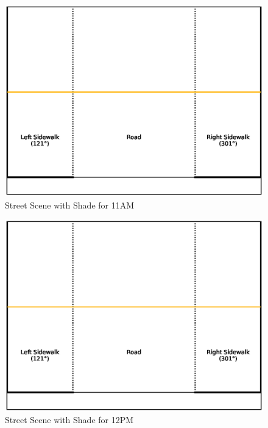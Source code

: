\documentclass[nohyperref]{article}
\theoremstyle{plain}
\theoremstyle{definition}
\theoremstyle{remark}
\begin{document}
\begin{figure}[ht]
\begin{center}
\centerline{\includegraphics[width=\columnwidth]{sidewalk_predictions/shade_at_11}}
\caption{Street Scene with Shade for 11AM}
\end{center}
\end{figure}

\begin{figure}[ht]
\begin{center}
\centerline{\includegraphics[width=\columnwidth]{sidewalk_predictions/shade_at_12}}
\caption{Street Scene with Shade for 12PM}
\end{center}
\end{figure}
\end{document}
